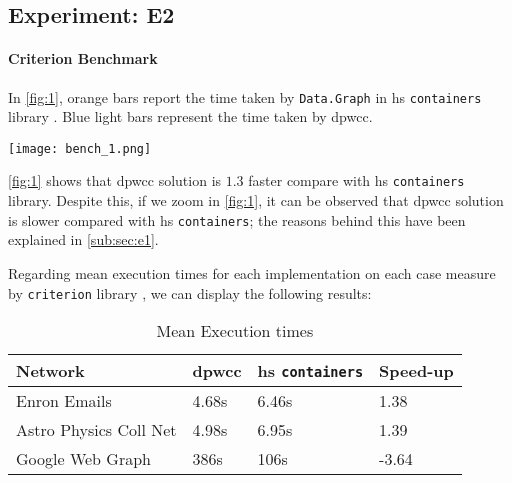\subsection{Experiment: E2}
\paragraph{Criterion Benchmark}
In \autoref{fig:1}, orange bars report the time taken by \texttt{Data.Graph} in \acrshort{hs} \texttt{containers} library \cite{containers}. Blue light bars represent the time taken by \acrshort{dpwcc}.

\begin{minipage}[t]{\linewidth}
  \texttt{[image: bench\_1.png]}
  \captionsetup{type=figure}
  \label{fig:1}
\end{minipage}

\autoref{fig:1} shows that \acrshort{dpwcc} solution is $1.3$ faster compare with \acrshort{hs} \texttt{containers} library. Despite this, if we zoom  in \autoref{fig:1}, it can be observed that \acrshort{dpwcc} solution is slower compared with \acrshort{hs} \texttt{containers}; the reasons behind this have been explained in \autoref{sub:sec:e1}.
\iffalse
\begin{minipage}[t]{\linewidth}
  \texttt{[image: bench\_2]}
  \captionsetup{type=figure}
  \captionof{figure}{Benchmark 2 - DP in Haskell vs. Data.Graph Haskell}
  \label{fig:2}
\end{minipage}
\fi

Regarding mean execution times for each implementation on each case measure by \texttt{criterion} library \cite{criterion}, we can display the following results:

\begin{table}[H]
  \centering
  \begin{tabular}{|l|l|l|l|}
   \hline
   \textbf{Network} & \textbf{\acrshort{dpwcc}} & \textbf{\acrshort{hs} \texttt{containers}} & \textbf{Speed-up}\\
   \hline
   Enron Emails & 4.68s &  6.46s & 1.38\\
   \hline
   Astro Physics Coll Net & 4.98s & 6.95s  & 1.39\\
   \hline
   Google Web Graph & 386s & 106s & -3.64\\
   \hline
  \end{tabular}
 \caption{Mean Execution times}
 \label{table:6}
 \end{table}

